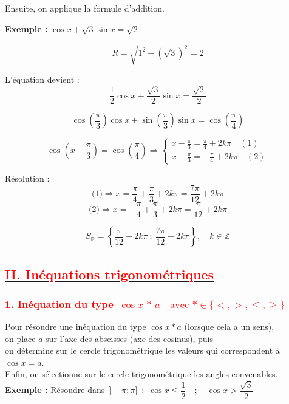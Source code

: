 \documentclass[a4paper,12pt]{article}
\begin{document}
\noindent
Ensuite, on applique la formule d’addition.

\textbf{Exemple :} $ \cos x + \sqrt{3} \sin x = \sqrt{2} $

\[
R = \sqrt{1^2 + (\sqrt{3})^2} = 2
\]

\noindent
L'équation devient :
\[
\frac{1}{2} \cos x + \frac{\sqrt{3}}{2} \sin x = \frac{\sqrt{2}}{2}
\]

\[
\cos\left(\frac{\pi}{3}\right)\cos x + \sin\left(\frac{\pi}{3}\right)\sin x = \cos\left(\frac{\pi}{4}\right)
\]

\[
\cos\left(x - \frac{\pi}{3} \right) = \cos\left( \frac{\pi}{4} \right)
\Rightarrow
\begin{cases}
x - \frac{\pi}{3} = \frac{\pi}{4} + 2k\pi \quad (1)\\
x - \frac{\pi}{3} = -\frac{\pi}{4} + 2k\pi \quad (2)
\end{cases}
\]

\noindent
Résolution :
\[
\text{(1)} \Rightarrow x = \frac{\pi}{4} + \frac{\pi}{3} + 2k\pi = \frac{7\pi}{12} + 2k\pi
\]
\[
\text{(2)} \Rightarrow x = -\frac{\pi}{4} + \frac{\pi}{3} + 2k\pi = \frac{\pi}{12} + 2k\pi
\]

\[
\boxed{S_\mathbb{R} = \left\{ \frac{\pi}{12} + 2k\pi \ ;\ \frac{7\pi}{12} + 2k\pi \right\},\quad k \in \mathbb{Z}}
\]

\subsection*{\underline{\textcolor{red}{II. Inéquations trigonométriques}}}

\subsubsection*{\textcolor{red}{1. Inéquation du type $\, \cos x \,\ast\, a \quad \text{avec } \ast \in \{<, >, \leq, \geq\}$}}

\noindent
Pour résoudre une inéquation du type $\cos x \ast a$ (lorsque cela a un sens),\\
on place $a$ sur l'axe des abscisses (axe des cosinus), puis\\
on détermine sur le cercle trigonométrique les valeurs qui correspondent à $\cos x = a$.\\
Enfin, on sélectionne sur le cercle trigonométrique les angles convenables.\\

\noindent
\textbf{Exemple :} Résoudre dans $\, ]-\pi ; \pi] \,$ : $\, \cos x \leq \dfrac{1}{2} \quad ; \quad \cos x > \dfrac{\sqrt{3}}{2}$
\end{document}
